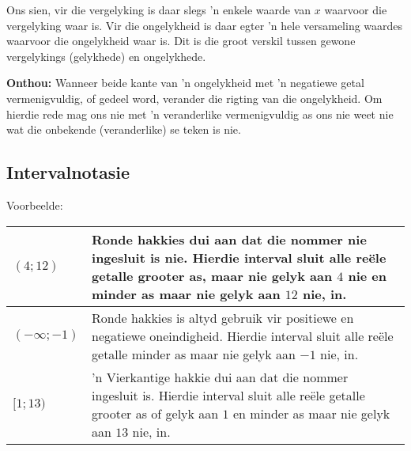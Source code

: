 Ons sien, vir die vergelyking is daar slegs ’n enkele waarde van  $x$ waarvoor die vergelyking waar is. Vir
die ongelykheid is daar egter ’n hele versameling waardes waarvoor die ongelykheid waar is. Dit is die groot
verskil tussen gewone vergelykings (gelykhede) en ongelykhede.\par 

\textbf{Onthou: } Wanneer beide kante van ’n ongelykheid met ’n negatiewe getal vermenigvuldig, of gedeel word, verander die rigting van
die ongelykheid. Om hierdie rede mag ons nie met ’n veranderlike vermenigvuldig as
ons nie weet nie wat die onbekende (veranderlike) se teken is nie.\par
{}

\subsection*{Intervalnotasie}
Voorbeelde:
\\
\begin{table}[H]
\begin{tabular}{|p{5cm}|p{8cm}|}
\hline
  $(4;12)$ &  Ronde hakkies dui aan dat die nommer nie ingesluit is nie. Hierdie interval sluit alle reële getalle grooter as, maar nie gelyk aan $4$ nie en minder as maar nie gelyk aan $12$ nie, in.
\\ \hline
 $(- \infty; -1)$ & Ronde hakkies is altyd gebruik vir positiewe en negatiewe oneindigheid. Hierdie interval sluit alle reële getalle minder as maar nie gelyk aan $-1$ nie, in.
\\ \hline
 $[1; 13)$ & 'n Vierkantige hakkie dui aan dat die nommer ingesluit is. Hierdie interval sluit alle reële getalle grooter as of gelyk aan $1$ en minder as maar nie gelyk aan $13$ nie, in.
\\ \hline
\end{tabular}
\end{table}

